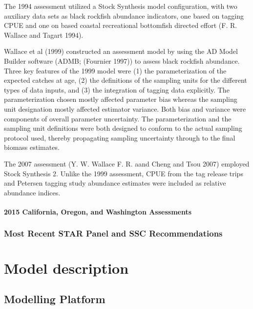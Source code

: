 \documentclass[11pt,
  english,
  letterpaper,
]{article}
\begin{document}
The 1994 assessment utilized a Stock Synthesis model configuration, with two auxiliary data sets as black rockfish abundance indicators, one based on tagging CPUE and one on based coastal recreational bottomfish directed effort (F. R. Wallace and Tagart 1994).

Wallace et al (1999) constructed an assessment model by using the AD Model Builder software (ADMB; (Fournier 1997)) to assess black rockfish abundance. Three key features of the 1999 model were (1) the parameterization of the expected catches at age, (2) the definitions of the sampling units for the different types of data inputs, and (3) the integration of tagging data explicitly. The parameterization chosen mostly affected parameter bias whereas the sampling unit designation mostly affected estimator variance. Both bias and variance were components of overall parameter uncertainty. The parameterization and the sampling unit definitions were both designed to conform to the actual sampling protocol used, thereby propagating sampling uncertainty through to the final biomass estimates.

The 2007 assessment (Y. W. Wallace F. R. aand Cheng and Tsou 2007) employed Stock Synthesis 2. Unlike the 1999 assessment, CPUE from the tag release trips and Petersen tagging study abundance estimates were included as relative abundance indices.

\hypertarget{california-oregon-and-washington-assessments}{%
\paragraph{2015 California, Oregon, and Washington Assessments}\label{california-oregon-and-washington-assessments}}

\hypertarget{most-recent-star-panel-and-ssc-recommendations}{%
\subsubsection{Most Recent STAR Panel and SSC Recommendations}\label{most-recent-star-panel-and-ssc-recommendations}}

\hypertarget{model-description}{%
\section{Model description}\label{model-description}}

\hypertarget{modelling-platform}{%
\subsection{Modelling Platform}\label{modelling-platform}}
\end{document}
